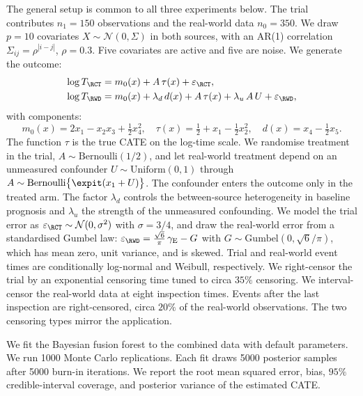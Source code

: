 The general setup is common to all three experiments below.
The trial contributes $n_1 = 150$ observations and the real-world data $n_0 = 350$.
We draw $p = 10$ covariates $X \sim \mathcal{N}(0, \Sigma)$ in both sources, with an AR(1) correlation $\Sigma_{ij} = \rho^{|i-j|}$, $\rho = 0.3$.
Five covariates are active and five are noise.
We generate the outcome:
\begin{equation}
  \begin{aligned}
    \log T_{\RCT} &= m_0(x) + A\, \tau(x) + \varepsilon_{\RCT}, \\
    \log T_{\RWD} &= m_0(x) + \lambda_d\, d(x) + A\, \tau(x)
                     + \lambda_u\, A\, U + \varepsilon_{\RWD},
  \end{aligned}
  \label{eq:sim-dgp}
\end{equation}
with components:
\begin{equation}
  m_0(x) = 2 x_1 - x_2 x_3 + \tfrac{1}{2} x_4^2, \quad \tau(x) = \tfrac{1}{2} + x_1 - \tfrac{1}{2} x_2^2, \quad d(x) = x_4 - \tfrac{1}{2} x_5.
\end{equation}
The function $\tau$ is the true CATE on the log-time scale.
We randomise treatment in the trial, $A \sim \mathrm{Bernoulli}(1/2)$, and let real-world treatment depend on an unmeasured confounder $U \sim \mathrm{Uniform}(0, 1)$ through $A \sim \mathrm{Bernoulli}\bigl\{\expit(x_1 + U)\bigr\}$.
The confounder enters the outcome only in the treated arm.
The factor $\lambda_d$ controls the between-source heterogeneity in baseline prognosis and $\lambda_u$ the strength of the unmeasured confounding.
We model the trial error as $\varepsilon_{\RCT} \sim \mathcal{N}(0, \sigma^2)$ with $\sigma = 3/4$, and draw the real-world error from a standardised Gumbel law: $\varepsilon_{\RWD} = \tfrac{\sqrt{6}}{\pi}\, \gamma_{\mathrm{E}} - G$ with $G \sim \mathrm{Gumbel}(0, \sqrt{6}/\pi)$, which has mean zero, unit variance, and is skewed.
Trial and real-world event times are conditionally log-normal and Weibull, respectively.
We right-censor the trial by an exponential censoring time tuned to circa $35\%$ censoring.
We interval-censor the real-world data at eight inspection times.
Events after the last inspection are right-censored, circa $20\%$ of the real-world observations.
The two censoring types mirror the application.

We fit the Bayesian fusion forest to the combined data with default parameters.
We run 1000 Monte Carlo replications.
Each fit draws 5000 posterior samples after 5000 burn-in iterations.
We report the root mean squared error, bias, $95\%$ credible-interval coverage, and posterior variance of the estimated CATE.

